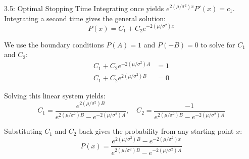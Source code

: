 \documentclass{beamer}
\begin{document}
	\begin{frame}{3.5: Optimal Stopping Time}
		Integrating once yields $e^{2(\mu/\sigma^2) x} P'(x) = c_1$. 
		Integrating a second time gives the general solution:
		$$P(x) = C_1 + C_2 e^{-2(\mu/\sigma^2) x}$$
		
		We use the boundary conditions $P(A) = 1$ and $P(-B) = 0$ to solve for $C_1$ and $C_2$:
		\begin{align*}
			C_1 + C_2 e^{-2(\mu/\sigma^2) A} &= 1 \\
			C_1 + C_2 e^{2(\mu/\sigma^2) B} &= 0
		\end{align*}
		
		\vspace{0.2cm}
		Solving this linear system yields:
		$$C_1 = \frac{e^{2(\mu/\sigma^2) B}}{e^{2(\mu/\sigma^2) B} - e^{-2(\mu/\sigma^2) A}}, \quad C_2 = \frac{-1}{e^{2(\mu/\sigma^2) B} - e^{-2(\mu/\sigma^2) A}}$$
		
		\vspace{0.2cm}
		Substituting $C_1$ and $C_2$ back gives the probability from any starting point $x$:
		$$P(x) = \frac{e^{2(\mu/\sigma^2) B} - e^{-2(\mu/\sigma^2) x}}{e^{2(\mu/\sigma^2) B} - e^{-2(\mu/\sigma^2) A}}$$
	\end{frame}
\end{document}
